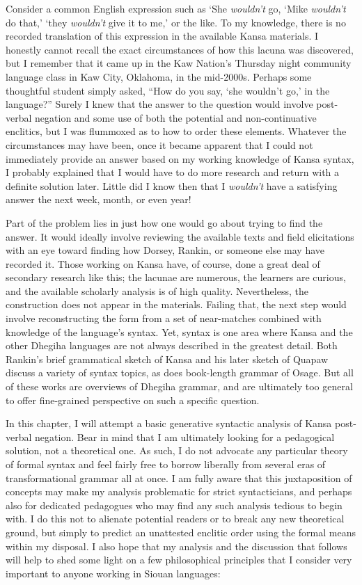 \documentclass[output=paper]{LSP/langsci}
\begin{document}
Consider a common English expression such as `She \textit{wouldn't} go, `Mike \textit{wouldn't} do that,' `they \textit{wouldn't} give it to me,' or the like. To my knowledge, there is no recorded translation of this expression in the available Kansa materials. I honestly cannot recall the exact circumstances of how this lacuna was discovered, but I remember that it came up in the Kaw Nation's Thursday night community language class in Kaw City, Oklahoma, in the mid-2000s. Perhaps some thoughtful student simply asked, ``How do you say, `she wouldn't go,' in the language?'' Surely I knew that the answer to the question would involve post-verbal negation and some use of both the potential and non-continuative enclitics, but I was flummoxed as to how to order these elements. Whatever the circumstances may have been, once it became apparent that I could not immediately provide an answer based on my working knowledge of Kansa syntax, I probably explained that I would have to do more research and return with a definite solution later. Little did I know then that I \textit{wouldn't} have a satisfying answer the next week, month, or even year!

Part of the problem lies in just how one would go about trying to find the answer. It would ideally involve reviewing the available texts and field elicitations with an eye toward finding how Dorsey, Rankin, or someone else may have recorded it. Those working on Kansa have, of course, done a great deal of secondary research like this; the lacunae are numerous, the learners are curious, and the available scholarly analysis is of high quality. Nevertheless, the construction does not appear in the materials. Failing that, the next step would involve reconstructing the form from a set of near-matches combined with knowledge of the language's syntax. Yet, syntax is one area where Kansa and the other Dhegiha languages are not always described in the greatest detail. Both Rankin's brief grammatical sketch of Kansa \citeyear{Rankin1989} and his later sketch of Quapaw \citeyear{Rankin2005} discuss a variety of syntax topics, as does  book-length grammar of Osage. But all of these works are overviews of Dhegiha grammar, and are ultimately too general to offer fine-grained perspective on such a specific question. 

In this chapter, I will attempt a basic generative syntactic analysis of Kansa post-verbal negation. Bear in mind that I am ultimately looking for a pedagogical solution, not a theoretical one. As such, I do not advocate any particular theory of formal syntax and feel fairly free to borrow liberally from several eras of transformational grammar all at once. I am fully aware that this juxtaposition of concepts may make my analysis problematic for strict syntacticians, and perhaps also for dedicated pedagogues who may find any such analysis tedious to begin with. I do this not to alienate potential readers or to break any new theoretical ground, but simply to predict an unattested enclitic order using the formal means within my disposal. I also hope that my analysis and the discussion that follows will help to shed some light on a few philosophical principles that I consider very important to anyone working in Siouan languages:
\end{document}
